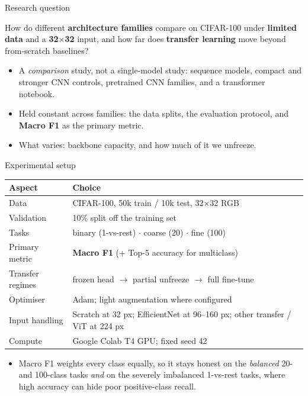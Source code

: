 \documentclass[aspectratio=169,11pt]{beamer}
\begin{document}
\begin{frame}{Research question}
  \vfill
  \begin{block}{}
    \centering\large
    How do different \textbf{architecture families} compare on CIFAR-100
    under \textbf{limited data} and a \textbf{32$\times$32} input, and how far does
    \textbf{transfer learning} move beyond from-scratch baselines?
  \end{block}
  \vfill
  \begin{itemize}
    \item A \emph{comparison} study, not a single-model study: sequence models, compact and
          stronger CNN controls, pretrained CNN families, and a transformer notebook.
    \item Held constant across families: the data splits, the evaluation protocol, and
          \textbf{Macro F1} as the primary metric.
    \item What varies: backbone capacity, and how much of it we unfreeze.
  \end{itemize}
  \vfill
\end{frame}


\begin{frame}{Experimental setup}
  \centering
  \renewcommand{\arraystretch}{1.25}
  \begin{tabular}{@{}ll@{}}
    \toprule
    \textbf{Aspect} & \textbf{Choice} \\
    \midrule
    Data            & CIFAR-100, 50k train / 10k test, 32$\times$32 RGB \\
    Validation      & 10\% split off the training set \\
    Tasks           & binary (1-vs-rest) $\cdot$ coarse (20) $\cdot$ fine (100) \\
    Primary metric  & \textbf{Macro F1} \;(+ Top-5 accuracy for multiclass) \\
    Transfer regimes& frozen head $\rightarrow$ partial unfreeze $\rightarrow$ full fine-tune \\
    Optimiser       & Adam; light augmentation where configured \\
    Input handling  & Scratch at 32 px; EfficientNet at 96--160 px; other transfer / ViT at 224 px \\
    Compute         & Google Colab T4 GPU; fixed seed 42 \\
    \bottomrule
  \end{tabular}

  \vfill
  \begin{itemize}
    \item Macro F1 weights every class equally, so it stays honest on the
          \emph{balanced} 20- and 100-class tasks \emph{and} on the severely
          imbalanced 1-vs-rest tasks, where high accuracy can hide poor positive-class recall.
  \end{itemize}
\end{frame}
\end{document}
